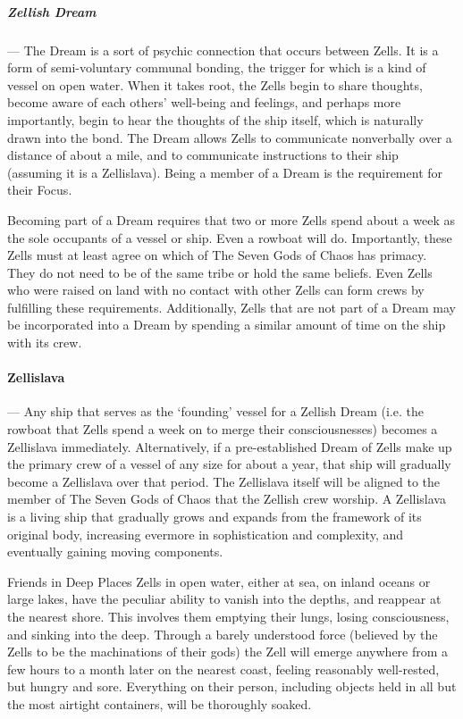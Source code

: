 \documentclass[oneside,11pt,english]{book}
\begin{document}
\subparagraph{Zellish Dream}---\quad
The Dream is a sort of psychic connection that occurs between Zells. It is a form of semi-voluntary communal bonding, the trigger for which is a kind of vessel on open water. When it takes root, the Zells begin to share thoughts, become aware of each others' well-being and feelings, and perhaps more importantly, begin to hear the thoughts of the ship itself, which is naturally drawn into the bond. The Dream allows Zells to communicate nonverbally over a distance of about a mile, and to communicate instructions to their ship (assuming it is a Zellislava). Being a member of a Dream is the requirement for their Focus.


Becoming part of a Dream requires that two or more Zells spend about a week as the sole occupants of a vessel or ship. Even a rowboat will do. Importantly, these Zells must at least agree on which of The Seven Gods of Chaos has primacy. They do not need to be of the same tribe or hold the same beliefs. Even Zells who were raised on land with no contact with other Zells can form crews by fulfilling these requirements. Additionally, Zells that are not part of a Dream may be incorporated into a Dream by spending a similar amount of time on the ship with its crew.


\paragraph{Zellislava}---\quad
Any ship that serves as the ‘founding’ vessel for a Zellish Dream (i.e. the rowboat that Zells spend a week on to merge their consciousnesses) becomes a Zellislava immediately.
Alternatively, if a pre-established Dream of Zells make up the primary crew of a vessel of any size for about a year, that ship will gradually become a Zellislava over that period. The Zellislava itself will be aligned to the member of The Seven Gods of Chaos that the Zellish crew worship. A Zellislava is a living ship that gradually grows and expands from the framework of its original body, increasing evermore in sophistication and complexity, and eventually gaining moving components.


Friends in Deep Places
Zells in open water, either at sea, on inland oceans or large lakes, have the peculiar ability to 
vanish into the depths, and reappear at the nearest shore. This involves them emptying their lungs, 
losing consciousness, and sinking into the deep. Through a barely understood force (believed by 
the Zells to be the machinations of their gods) the Zell will emerge anywhere from a few hours to 
a month later on the nearest coast, feeling reasonably well-rested, but hungry and sore. 
Everything on their person, including objects held in all but the most airtight containers, will be 
thoroughly soaked. 
\end{document}
